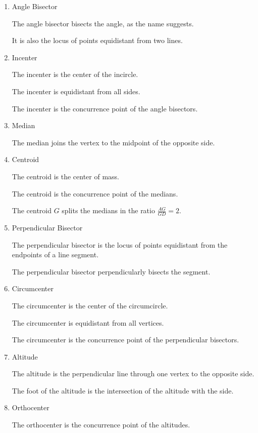 \begin{enumerate}
\item Angle Bisector
\begin{itemize}
\Item The angle bisector bisects the angle, as the name suggests.

\Item It is also the locus of points equidistant from two lines.
\end{itemize}

\item Incenter
\begin{itemize}
\Item The incenter is the center of the incircle.

\Item The incenter is equidistant from all sides.

\Item The incenter is the concurrence point of the angle bisectors.
\end{itemize}

\item Median
\begin{itemize}
\Item The median joins the vertex to the midpoint of the opposite side.
\end{itemize}

\item Centroid
\begin{itemize}
\Item The centroid is the center of mass.

\Item The centroid is the concurrence point of the medians.

\Item The centroid $G$ splits the medians in the ratio $\frac{AG}{GD}=2$.
\end{itemize}

\item Perpendicular Bisector
\begin{itemize}
\Item The perpendicular bisector is the locus of points equidistant from the endpoints of a line segment.

\Item The perpendicular bisector perpendicularly bisects the segment.
\end{itemize}

\item Circumcenter
\begin{itemize}
\Item The circumcenter is the center of the circumcircle.

\Item The circumcenter is equidistant from all vertices.

\Item The circumcenter is the concurrence point of the perpendicular bisectors.
\end{itemize}

\item Altitude
\begin{itemize}
\Item The altitude is the perpendicular line through one vertex to the opposite side.

\Item The foot of the altitude is the intersection of the altitude with the side.
\end{itemize}

\item Orthocenter
\begin{itemize}
\Item The orthocenter is the concurrence point of the altitudes.
\end{itemize}
\end{enumerate}

